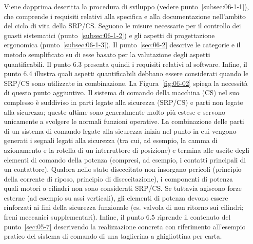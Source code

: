 Viene dapprima descritta la procedura di sviluppo (vedere punto~\ref{subsec:06-1-1}), che comprende i requisiti relativi alla specifica e alla documentazione nell'ambito del ciclo di vita della SRP/CS. Seguono le misure necessarie per il controllo dei guasti sistematici (punto~\ref{subsec:06-1-2}) e gli aspetti di progettazione ergonomica (punto~\ref{subsec:06-1-3}). Il punto~\ref{sec:06-2} descrive le categorie e il metodo semplificato su di esse basato per la valutazione degli aspetti quantificabili. Il punto 6.3 presenta quindi i requisiti relativi al software. Infine, il punto 6.4 illustra quali aspetti quantificabili debbano essere considerati quando le SRP/CS sono utilizzate in combinazione. La Figura~\ref{fig:06-02} spiega la necessità di questo punto aggiuntivo. Il sistema di comando della macchina (CS) nel suo complesso è suddiviso in parti legate alla sicurezza (SRP/CS) e parti non legate alla sicurezza; queste ultime sono generalmente molto più estese e servono unicamente a svolgere le normali funzioni operative. La combinazione delle parti di un sistema di comando legate alla sicurezza inizia nel punto in cui vengono generati i segnali legati alla sicurezza (tra cui, ad esempio, la camma di azionamento e la rotella di un interruttore di posizione) e termina alle uscite degli elementi di comando della potenza (compresi, ad esempio, i contatti principali di un contattore). Qualora nello stato diseccitato non insorgano pericoli (principio della corrente di riposo, principio di diseccitazione), i componenti di potenza quali motori o cilindri non sono considerati SRP/CS. Se tuttavia agiscono forze esterne (ad esempio su assi verticali), gli elementi di potenza devono essere rinforzati ai fini della sicurezza funzionale (es. valvola di non ritorno sui cilindri; freni meccanici supplementari). Infine, il punto 6.5 riprende il contenuto del punto~\ref{sec:05-7} descrivendo la realizzazione concreta con riferimento all'esempio pratico del sistema di comando di una taglierina a ghigliottina per carta.


\begin{center}
    \begin{minipage}{\textwidth}
        \centering
        \captionsetup{hypcap=false}
        \resizebox{0.85\textwidth}{!}{}
        \label{fig:06-02}
    \end{minipage}
\end{center}

